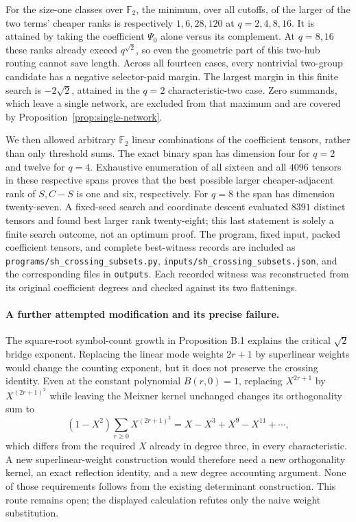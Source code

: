 For the size-one classes over $\mathbb F_2$, the minimum, over all
cutoffs, of the larger of the two terms' cheaper ranks is respectively
$1,6,28,120$ at $q=2,4,8,16$.  It is attained by taking the coefficient
$\Psi_0$ alone versus its complement.  At $q=8,16$ these ranks already
exceed $q^{\sqrt2}$, so even the geometric part of this two-hub routing
cannot save length.  Across all fourteen cases, every nontrivial
two-group candidate has a negative selector-paid margin.  The largest
margin in this finite search is $-2\sqrt2$, attained in the $q=2$
characteristic-two case.  Zero summands, which leave a single network,
are excluded from that maximum and are covered by
Proposition~\ref{prop:single-network}.

We then allowed arbitrary $\mathbb F_2$ linear combinations of the
coefficient tensors, rather than only threshold sums.  The exact binary
span has dimension four for $q=2$ and twelve for $q=4$.  Exhaustive
enumeration of all sixteen and all $4096$ tensors in these respective
spans proves that the best possible larger cheaper-adjacent rank of
$S,C-S$ is one and six, respectively.  For $q=8$ the span has dimension
twenty-seven.  A fixed-seed search and coordinate descent evaluated
$8391$ distinct tensors and found best larger rank twenty-eight; this
last statement is solely a finite search outcome, not an optimum proof.
The program, fixed input, packed coefficient tensors, and complete
best-witness records are included as
\texttt{programs/sh\_crossing\_subsets.py},
\texttt{inputs/sh\_crossing\_subsets.json}, and the corresponding files
in \texttt{outputs}.  Each recorded witness was reconstructed from its
original coefficient degrees and checked against its two flattenings.

\paragraph{A further attempted modification and its precise failure.}
The square-root symbol-count growth in Proposition B.1 explains the
critical $\sqrt2$ bridge exponent.  Replacing the linear mode weights
$2r+1$ by superlinear weights would change the counting exponent, but
it does not preserve the crossing identity.  Even at the constant
polynomial $B(r,0)=1$, replacing $X^{2r+1}$ by $X^{(2r+1)^2}$ while
leaving the Meixner kernel unchanged changes its orthogonality sum to
\[
 (1-X^2)\sum_{r\ge0}X^{(2r+1)^2}
   =X-X^3+X^9-X^{11}+\cdots,
\]
which differs from the required $X$ already in degree three, in every
characteristic.  A new superlinear-weight construction would therefore
need a new orthogonality kernel, an exact reflection identity, and a
new degree accounting argument.  None of those requirements follows
from the existing determinant construction.  This route remains open;
the displayed calculation refutes only the naive weight substitution.

